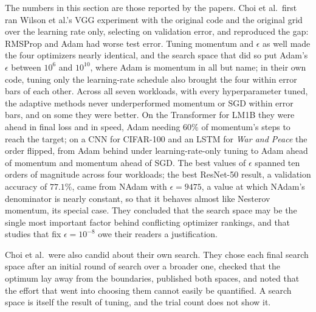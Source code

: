 \begin{refsection}
The numbers in this section are those reported by the papers. Choi et al.\ first ran Wilson et al.'s VGG experiment with the original code and the original grid over the learning rate only, selecting on validation error, and reproduced the gap: RMSProp and Adam had worse test error. Tuning momentum and $\epsilon$ as well made the four optimizers nearly identical, and the search space that did so put Adam's $\epsilon$ between $10^6$ and $10^{10}$, where Adam is momentum in all but name; in their own code, tuning only the learning-rate schedule also brought the four within error bars of each other. Across all seven workloads, with every hyperparameter tuned, the adaptive methods never underperformed momentum or SGD within error bars, and on some they were better. On the Transformer for LM1B they were ahead in final loss and in speed, Adam needing $60\%$ of momentum's steps to reach the target; on a CNN for CIFAR-100 and an LSTM for \emph{War and Peace} the order flipped, from Adam behind under learning-rate-only tuning to Adam ahead of momentum and momentum ahead of SGD. The best values of $\epsilon$ spanned ten orders of magnitude across four workloads; the best ResNet-50 result, a validation accuracy of $77.1\%$, came from NAdam with $\epsilon=9475$, a value at which NAdam's denominator is nearly constant, so that it behaves almost like Nesterov momentum, its special case. They concluded that the search space may be the single most important factor behind conflicting optimizer rankings, and that studies that fix $\epsilon=10^{-8}$ owe their readers a justification.

Choi et al.\ were also candid about their own search. They chose each final search space after an initial round of search over a broader one, checked that the optimum lay away from the boundaries, published both spaces, and noted that the effort that went into choosing them cannot easily be quantified. A search space is itself the result of tuning, and the trial count does not show it.


\end{refsection}
